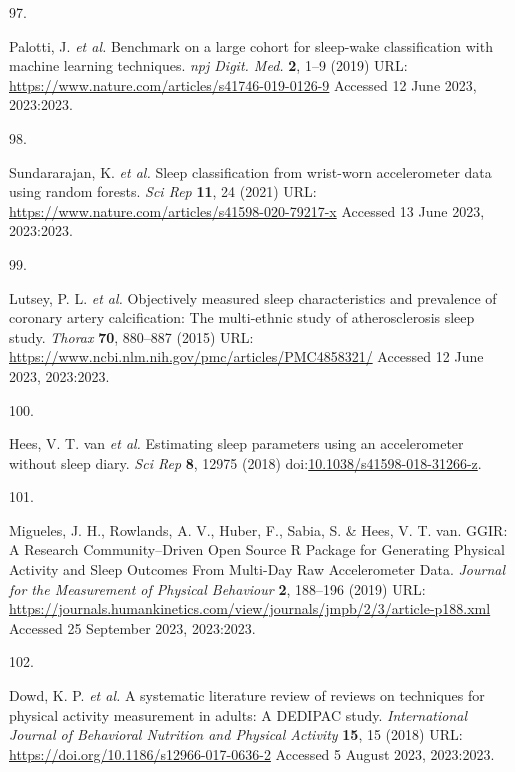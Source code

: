 \documentclass[
  10pt,
]{scrbook}
\newlength{\cslhangindent}
\newlength{\csllabelwidth}
\newlength{\cslentryspacingunit} %
\newenvironment{CSLReferences}[2] %
 {%
  \setlength{\parindent}{0pt}
  \ifodd #1
  \let\oldpar\par
  \def\par{\hangindent=\cslhangindent\oldpar}
  \fi
  \setlength{\parskip}{#2\cslentryspacingunit}
 }%
 {}
\newcommand{\CSLLeftMargin}[1]{\parbox[t]{\csllabelwidth}{#1}}
\newcommand{\CSLRightInline}[1]{\parbox[t]{\linewidth - \csllabelwidth}{#1}\break}
\let\originaltextbf\textbf
\renewcommand{\textbf}[1]{\textcolor{color1}{\textsf{\originaltextbf{#1}}}}
\begin{document}
\begin{CSLReferences}{0}{0}
\leavevmode{}%
\CSLLeftMargin{97. }%
\CSLRightInline{Palotti, J. \emph{et al.} Benchmark on a large cohort
for sleep-wake classification with machine learning techniques.
\emph{npj Digit. Med.} \textbf{2}, 1--9 (2019) URL:
\url{https://www.nature.com/articles/s41746-019-0126-9} Accessed 12 June
2023, 2023:2023.}

\leavevmode{}%
\CSLLeftMargin{98. }%
\CSLRightInline{Sundararajan, K. \emph{et al.} Sleep classification from
wrist-worn accelerometer data using random forests. \emph{Sci Rep}
\textbf{11}, 24 (2021) URL:
\url{https://www.nature.com/articles/s41598-020-79217-x} Accessed 13
June 2023, 2023:2023.}

\leavevmode{}%
\CSLLeftMargin{99. }%
\CSLRightInline{Lutsey, P. L. \emph{et al.} Objectively measured sleep
characteristics and prevalence of coronary artery calcification: The
multi-ethnic study of atherosclerosis sleep study. \emph{Thorax}
\textbf{70}, 880--887 (2015) URL:
\url{https://www.ncbi.nlm.nih.gov/pmc/articles/PMC4858321/} Accessed 12
June 2023, 2023:2023.}

\leavevmode{}%
\CSLLeftMargin{100. }%
\CSLRightInline{Hees, V. T. van \emph{et al.} Estimating sleep
parameters using an accelerometer without sleep diary. \emph{Sci Rep}
\textbf{8}, 12975 (2018)
doi:\href{https://doi.org/10.1038/s41598-018-31266-z}{10.1038/s41598-018-31266-z}.}

\leavevmode{}%
\CSLLeftMargin{101. }%
\CSLRightInline{Migueles, J. H., Rowlands, A. V., Huber, F., Sabia, S.
\& Hees, V. T. van. {GGIR}: {A} {Research} {Community}--{Driven} {Open}
{Source} {R} {Package} for {Generating} {Physical} {Activity} and
{Sleep} {Outcomes} {From} {Multi}-{Day} {Raw} {Accelerometer} {Data}.
\emph{Journal for the Measurement of Physical Behaviour} \textbf{2},
188--196 (2019) URL:
\url{https://journals.humankinetics.com/view/journals/jmpb/2/3/article-p188.xml}
Accessed 25 September 2023, 2023:2023.}

\leavevmode{}%
\CSLLeftMargin{102. }%
\CSLRightInline{Dowd, K. P. \emph{et al.} A systematic literature review
of reviews on techniques for physical activity measurement in adults: A
{DEDIPAC} study. \emph{International Journal of Behavioral Nutrition and
Physical Activity} \textbf{15}, 15 (2018) URL:
\url{https://doi.org/10.1186/s12966-017-0636-2} Accessed 5 August 2023,
2023:2023.}


\end{CSLReferences}
\end{document}

